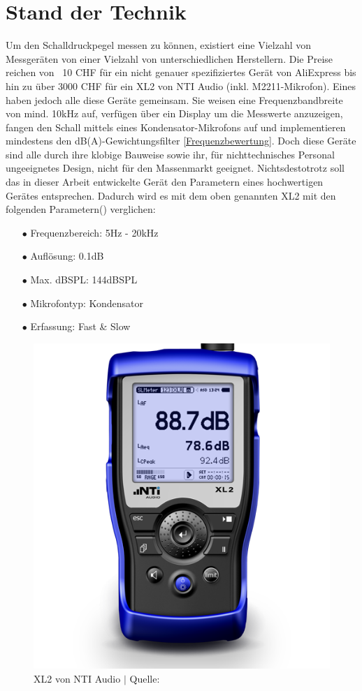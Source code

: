 \documentclass[12pt]{article}
\begin{document}
	\section{Stand der Technik}\label{Stand}
	Um den Schalldruckpegel messen zu können, existiert eine Vielzahl von Messgeräten von einer Vielzahl von unterschiedlichen Herstellern. Die Preise reichen von ~10 CHF für ein nicht genauer spezifiziertes Gerät von AliExpress bis hin zu über 3000 CHF für ein XL2 von NTI Audio (inkl. M2211-Mikrofon). Eines haben jedoch alle diese Geräte gemeinsam. Sie weisen eine Frequenzbandbreite von mind. 10kHz auf, verfügen über ein Display um die Messwerte anzuzeigen, fangen den Schall mittels eines Kondensator-Mikrofons auf und implementieren mindestens den dB(A)-Gewichtungsfilter \ref{Frequenzbewertung}. Doch diese Geräte sind alle durch ihre klobige Bauweise sowie ihr, für nichttechnisches Personal ungeeignetes Design, nicht für den Massenmarkt geeignet. Nichtsdestotrotz soll das in dieser Arbeit entwickelte Gerät den Parametern eines hochwertigen Gerätes entsprechen. Dadurch wird es mit dem oben genannten XL2 mit den folgenden Parametern(\cite{noauthor_xl2_nodate}) verglichen:
	\begin{itemize}[topsep=10pt,partopsep=0pt,labelwidth=5cm,align=left,itemindent=5cm]
		\item[$\bullet$ Frequenzbereich:]  5Hz - 20kHz
		\item[$\bullet$ Auflösung:]  0.1dB
		\item[$\bullet$ Max. dBSPL:]  144dBSPL
		\item[$\bullet$ Mikrofontyp:]  Kondensator
		\item[$\bullet$ Erfassung:]  Fast \& Slow
	\end{itemize}
	\begin{figure}[H]
		\centering
		\includegraphics[width=0.4\linewidth]{images/BAT_NTi-Audio-XL2-500}
		\caption{XL2 von NTI Audio $\vert$ Quelle: \cite{noauthor_xl2_nodate}}
		\label{fig:batnti-audio-xl2-500}
	\end{figure}
		
\end{document}
